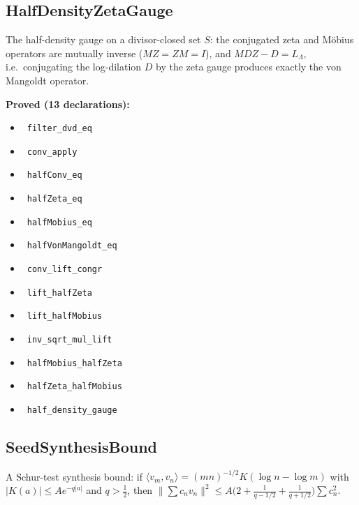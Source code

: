 \documentclass{report}
\theoremstyle{definition}
\begin{document}
\subsection{HalfDensityZetaGauge}
The half-density gauge on a divisor-closed set $S$: the conjugated zeta and M\"obius operators are mutually inverse ($MZ=ZM=I$), and $MDZ-D=L_\Lambda$, i.e.\ conjugating the log-dilation $D$ by the zeta gauge produces exactly the von Mangoldt operator.

\noindent\textbf{Proved (13 declarations):}
\begin{itemize}
  \item {}\leanok\ \texttt{filter\_dvd\_eq}
  \item {}\leanok\ \texttt{conv\_apply}
  \item {}\leanok\ \texttt{halfConv\_eq}
  \item {}\leanok\ \texttt{halfZeta\_eq}
  \item {}\leanok\ \texttt{halfMobius\_eq}
  \item {}\leanok\ \texttt{halfVonMangoldt\_eq}
  \item {}\leanok\ \texttt{conv\_lift\_congr}
  \item {}\leanok\ \texttt{lift\_halfZeta}
  \item {}\leanok\ \texttt{lift\_halfMobius}
  \item {}\leanok\ \texttt{inv\_sqrt\_mul\_lift}
  \item {}\leanok\ \texttt{halfMobius\_halfZeta}
  \item {}\leanok\ \texttt{halfZeta\_halfMobius}
  \item {}\leanok\ \texttt{half\_density\_gauge}
\end{itemize}

\subsection{SeedSynthesisBound}
A Schur-test synthesis bound: if $\langle v_m,v_n\rangle=(mn)^{-1/2}K(\log n-\log m)$ with $|K(a)|\le Ae^{-q|a|}$ and $q>\tfrac12$, then $\|\sum c_n v_n\|^2\le A\bigl(2+\tfrac1{q-1/2}+\tfrac1{q+1/2}\bigr)\sum c_n^2$.
\end{document}
